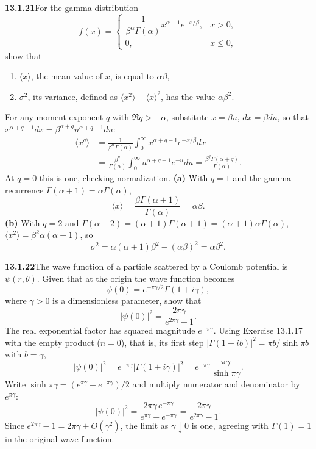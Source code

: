 \par\bigskip
\noindent\textbf{13.1.21}\quad For the gamma distribution
\[
f(x)=\begin{cases}
\dfrac{1}{\beta^{\alpha}\Gamma(\alpha)}x^{\alpha-1}e^{-x/\beta}, & x>0,\\[8pt]
0, & x\le0,
\end{cases}
\]
show that
\begin{enumerate}
\item[(a)] $\langle x\rangle$, the mean value of $x$, is equal to
  $\alpha\beta$,
\item[(b)] $\sigma^{2}$, its variance, defined as
  $\langle x^{2}\rangle-\langle x\rangle^{2}$, has the value $\alpha\beta^{2}$.
\end{enumerate}
\par\smallskip
{}
\solution
{}
For any moment exponent $q$ with $\Re q>-\alpha$, substitute
$x=\beta u$, $dx=\beta du$, so that
$x^{\alpha+q-1}dx=\beta^{\alpha+q}u^{\alpha+q-1}du$:
\begin{align*}
\langle x^q\rangle
&=\frac1{\beta^\alpha\Gamma(\alpha)}
 \int_0^\infty x^{\alpha+q-1}e^{-x/\beta}dx\\
&=\frac{\beta^q}{\Gamma(\alpha)}
 \int_0^\infty u^{\alpha+q-1}e^{-u}du
=\frac{\beta^q\Gamma(\alpha+q)}{\Gamma(\alpha)}.
\end{align*}
At $q=0$ this is one, checking normalization.
\textbf{(a)} With $q=1$ and the gamma recurrence
$\Gamma(\alpha+1)=\alpha\Gamma(\alpha)$,
\[
\boxed{\langle x\rangle
=\frac{\beta\Gamma(\alpha+1)}{\Gamma(\alpha)}=\alpha\beta}.
\]
\textbf{(b)} With $q=2$ and
$\Gamma(\alpha+2)=(\alpha+1)\Gamma(\alpha+1)=(\alpha+1)\alpha\Gamma(\alpha)$,
$\langle x^2\rangle=\beta^2\alpha(\alpha+1)$, so
\[
\boxed{\sigma^2=\alpha(\alpha+1)\beta^2-(\alpha\beta)^2
=\alpha\beta^2}.
\]


\par\bigskip
\noindent\textbf{13.1.22}\quad The wave function of a particle scattered by a
Coulomb potential is $\psi(r,\theta)$. Given that at the origin the wave
function becomes
\[
\psi(0)=e^{-\pi\gamma/2}\Gamma(1+i\gamma),
\]
where $\gamma>0$ is a dimensionless parameter, show that
\[
|\psi(0)|^{2}=\frac{2\pi\gamma}{e^{2\pi\gamma}-1}.
\]
\solution
The real exponential factor has squared magnitude $e^{-\pi\gamma}$.
Using Exercise 13.1.17 with the empty product ($n=0$), that is, its
first step $|\Gamma(1+ib)|^2=\pi b/\sinh\pi b$ with $b=\gamma$,
\[
|\psi(0)|^2=e^{-\pi\gamma}|\Gamma(1+i\gamma)|^2
=e^{-\pi\gamma}\frac{\pi\gamma}{\sinh\pi\gamma}.
\]
Write $\sinh\pi\gamma=(e^{\pi\gamma}-e^{-\pi\gamma})/2$
and multiply numerator and denominator by $e^{\pi\gamma}$:
\[
|\psi(0)|^2
=\frac{2\pi\gamma\,e^{-\pi\gamma}}{e^{\pi\gamma}-e^{-\pi\gamma}}
=\boxed{\frac{2\pi\gamma}{e^{2\pi\gamma}-1}}.
\]
Since $e^{2\pi\gamma}-1=2\pi\gamma+O(\gamma^2)$, the limit as
$\gamma\downarrow0$ is one, agreeing with $\Gamma(1)=1$ in the
original wave function.



